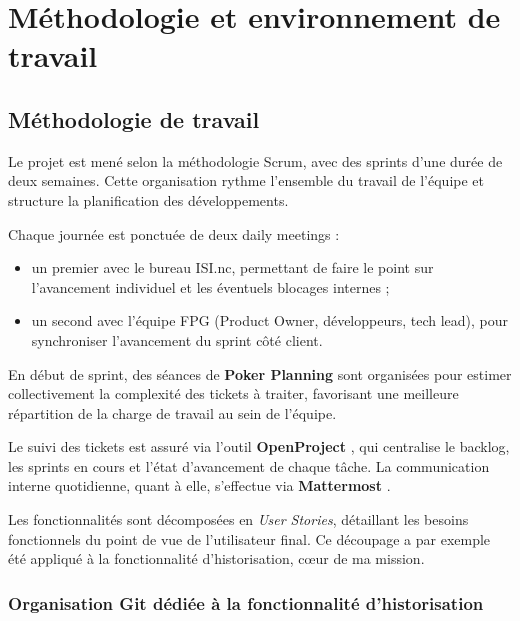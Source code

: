 
\chapter{Méthodologie et environnement de travail}

\section{Méthodologie de travail}

Le projet est mené selon la méthodologie Scrum, avec des sprints d'une
durée de deux semaines. Cette organisation rythme l'ensemble du travail
de l'équipe et structure la planification des développements.

Chaque journée est ponctuée de deux daily meetings :

\begin{itemize}
  \item un premier avec le bureau ISI.nc, permettant de faire le point
        sur l'avancement individuel et les éventuels blocages internes ;
  \item un second avec l'équipe FPG (Product Owner, développeurs, tech
        lead), pour synchroniser l'avancement du sprint côté client.
\end{itemize}

En début de sprint, des séances de \textbf{Poker Planning} sont organisées
pour estimer collectivement la complexité des tickets à traiter, favorisant
une meilleure répartition de la charge de travail au sein de l'équipe.

Le suivi des tickets est assuré via l'outil \textbf{OpenProject}
, qui centralise le backlog, les
sprints en cours et l'état d'avancement de chaque tâche. La communication
interne quotidienne, quant à elle, s'effectue via \textbf{Mattermost}
.

Les fonctionnalités sont décomposées en \textit{User Stories}, détaillant
les besoins fonctionnels du point de vue de l'utilisateur final. Ce
découpage a par exemple été appliqué à la fonctionnalité d'historisation,
cœur de ma mission.

\subsection{Organisation Git dédiée à la fonctionnalité d'historisation}
\label{sec:git-workflow-historisation}

